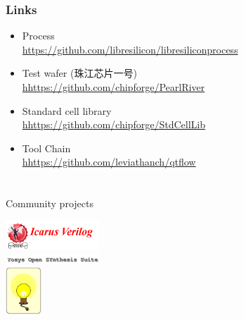 \documentclass{beamer}
\begin{document}
\begin{frame}
	\frametitle{Links}
	\begin{itemize}
	\item Process \\
		\url{https://github.com/libresilicon/libresiliconprocess}
	\item Test wafer (\cjkfont 珠江芯片一号) \\
		\url{hhttps://github.com/chipforge/PearlRiver}
	\item Standard cell library \\
		\url{hhttps://github.com/chipforge/StdCellLib}
	\item Tool Chain \\
		\url{hhttps://github.com/leviathanch/qtflow}
	\end{itemize}
\end{frame}



\section[Who]{}

\begin{frame}{Community projects}
	\begin{center}
		\includegraphics[width=100pt]{Icarus.png} \\
		\includegraphics[width=100pt]{Yosys.png} \\
		\includegraphics[height=50pt]{Opencircuit.png}
	\end{center}
\end{frame}
\end{document}

